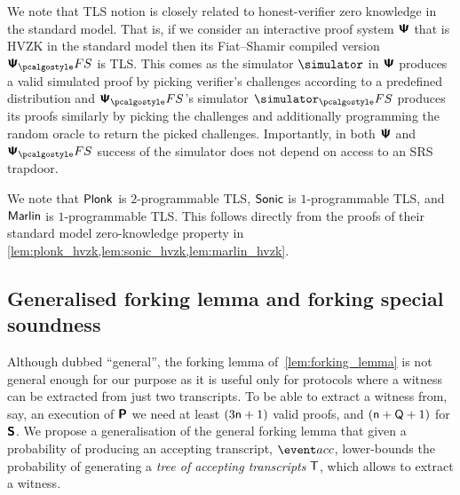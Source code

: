   
\begin{remark}
  We note that TLS notion is closely related to honest-verifier zero knowledge in the standard model. That is, if we consider an interactive proof system $\bm{\mathsf{\Psi}}$ that is HVZK in the standard model then its Fiat--Shamir compiled version $\proofsystem_\fs$ is TLS. This comes as the simulator $\simulator$ in $\bm{\mathsf{\Psi}}$ produces a valid simulated proof by picking verifier's challenges according to a predefined distribution and $\proofsystem_\fs$'s simulator $\simulator_\fs$ produces its proofs similarly by picking the challenges and additionally programming the random oracle to return the picked challenges. Importantly, in both $\bm{\mathsf{\Psi}}$ and $\proofsystem_\fs$ success of the simulator does not depend on access to an SRS trapdoor.
\end{remark}

We note that $\textnormal{\textsf{Plonk}}$ is $2$-programmable TLS, ${\textnormal{\textsf{Sonic}}}$ is $1$-programmable TLS,
and ${\textnormal{\textsf{Marlin}}}$ is $1$-programmable TLS. This follows directly from the proofs of
their standard model zero-knowledge property in
\cref{lem:plonk_hvzk,lem:sonic_hvzk,lem:marlin_hvzk}. 





\subsection{Generalised forking lemma and forking special soundness}
Although dubbed ``general'', the forking lemma of~\cref{lem:forking_lemma} is not
general enough for our purpose as it is useful only for protocols where a witness
can be extracted from just two transcripts. To be able to extract a witness
from, say, an execution of $\bm{\mathsf{P}}$ we need at least
$(3 \mathsf{n} + 1)$ valid proofs, and $(\mathsf{n} + \mathsf{Q} + 1)$ for $\bm{\mathsf{S}}$. We
propose a generalisation of the general forking lemma that given a probability of
producing an accepting transcript, $\accProb$, lower-bounds the probability of
generating a \emph{tree of accepting transcripts} $\mathsf{T}$, which allows to
extract a witness.

